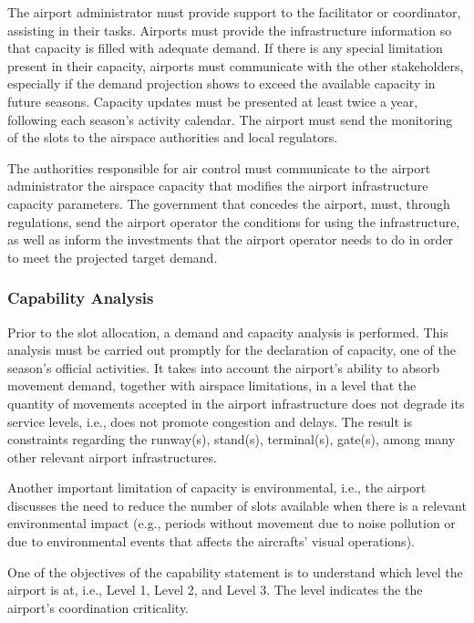 The airport administrator must provide support to the facilitator or coordinator, assisting in their tasks. Airports must provide the infrastructure information so that capacity is filled with adequate demand. If there is any special limitation present in their capacity, airports must communicate with the other stakeholders, especially if the demand projection shows to exceed the available capacity in future seasons. Capacity updates must be presented at least twice a year, following each season's activity calendar. The airport must send the monitoring of the slots to the airspace authorities and local regulators.

The authorities responsible for air control must communicate to the airport administrator the airspace capacity that modifies the airport infrastructure capacity parameters. The government that concedes the airport, must, through regulations, send the airport operator the conditions for using the infrastructure, as well as inform the investments that the airport operator needs to do in order to meet the projected target demand.

\subsubsection{Capability Analysis}

Prior to the slot allocation, a demand and capacity analysis is performed. This analysis must be carried out promptly for the declaration of capacity, one of the season's official activities. It takes into account the airport's ability to absorb movement demand, together with airspace limitations, in a level that the quantity of movements accepted in the airport infrastructure does not degrade its service levels, i.e.,  does not promote congestion and delays. The result is constraints regarding the runway(s), stand(s), terminal(s), gate(s), among many other relevant airport infrastructures.

Another important limitation of capacity is environmental, i.e., the airport discusses the need to reduce the number of slots available when there is a relevant environmental impact (e.g., periods without movement due to noise pollution or due to environmental events that affects the aircrafts’ visual operations). 

One of the objectives of the capability statement is to understand which level the airport is at, i.e., Level 1, Level 2, and Level 3. The level indicates the the airport's coordination criticality. 

